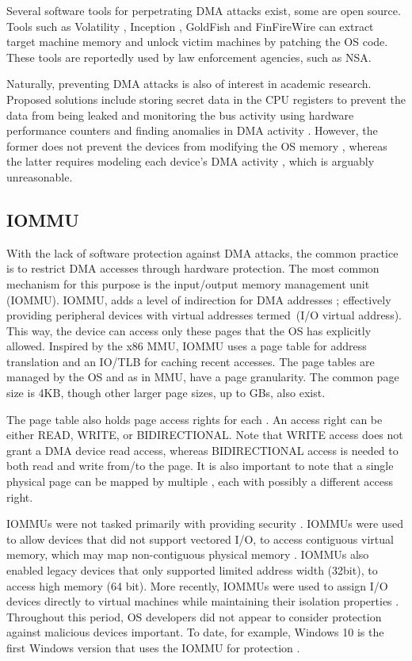 Several software tools for perpetrating DMA attacks exist, some are open source. Tools such as Volatility \cite{Vol}, Inception \cite{MM}, GoldFish \cite{GA10} and FinFireWire \cite{Fin14} can extract target machine memory and unlock victim machines by patching the OS code. These tools are reportedly used by law enforcement agencies, such as NSA.

Naturally, preventing DMA attacks is also of interest in academic research. Proposed solutions include storing secret data in the CPU registers to prevent the data from being leaked \cite{MFD11, CZG15, Sim11} and monitoring the bus activity using hardware performance counters and finding anomalies in DMA activity \cite{Ste13}. However, the former does not prevent the devices from modifying the OS memory \cite{BR12}, whereas the latter requires modeling each device’s DMA activity \cite{Ste14}, which is arguably unreasonable.

\subsection{IOMMU}

With the lack of software protection against DMA attacks, the common practice is to restrict DMA accesses through hardware protection. The most common mechanism for this purpose is the input/output memory management unit (IOMMU). IOMMU, adds a level of indirection for DMA addresses \cite{WRC08,YZ15,SB12,MTF12}; effectively providing peripheral devices with virtual addresses termed~\iova(I/O virtual address). This way, the device can access only these pages that the OS has explicitly allowed. Inspired by the x86 MMU, IOMMU uses a page table for address translation and an IO/TLB for caching recent accesses.  The page tables are managed by the OS and as in MMU, have a page granularity. The common page size is 4KB, though other larger page sizes, up to GBs, also exist. 

The page table also holds page access rights for each \iova. An access right can be either READ, WRITE, or BIDIRECTIONAL. Note that WRITE access does not grant a DMA device read access, whereas BIDIRECTIONAL access is needed to both read and write from/to the page. It is also important to note that a single physical page can be mapped by multiple \iova, each with possibly a different access right.

IOMMUs were not tasked primarily with providing security \cite{DWT79}. IOMMUs were used to allow devices that did not support vectored I/O, to access contiguous virtual memory, which may map non-contiguous physical memory \cite{Chu96, WMM97}. IOMMUs also enabled legacy devices that only supported limited address width (32bit), to access high memory (64 bit). More recently, IOMMUs were used to assign I/O devices directly to virtual machines while maintaining their isolation properties \cite{Int16b, AMD16}. Throughout this period, OS developers did not appear to consider protection against malicious devices important. To date, for example, Windows 10 is the first Windows version that uses the IOMMU for protection \cite{Mic17}.
